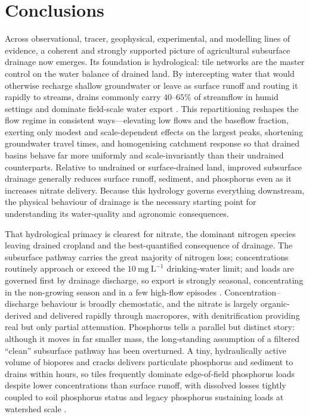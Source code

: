 \documentclass[11pt]{article}
\begin{document}
\section*{Conclusions}

Across observational, tracer, geophysical, experimental, and modelling lines
of evidence, a coherent and strongly supported picture of agricultural
subsurface drainage now emerges. Its foundation is hydrological: tile networks
are the master control on the water balance of drained land. By intercepting
water that would otherwise recharge shallow groundwater or leave as surface
runoff and routing it rapidly to streams, drains commonly carry $40$--$65\%$ of
streamflow in humid settings and dominate field-scale water export
\parencite{Schilling2019}. This
repartitioning reshapes the flow regime in consistent ways---elevating low
flows and the baseflow fraction, exerting only modest and scale-dependent
effects on the largest peaks, shortening groundwater travel times, and
homogenising catchment response so that drained basins behave far more
uniformly and scale-invariantly than their undrained counterparts. Relative to
undrained or surface-drained land, improved subsurface drainage generally
reduces surface runoff, sediment, and phosphorus even as it increases nitrate
delivery. Because this hydrology governs everything downstream, the physical
behaviour of drainage is the necessary starting point for understanding its
water-quality and agronomic consequences.

That hydrological primacy is clearest for nitrate, the dominant nitrogen
species leaving drained cropland and the best-quantified consequence of
drainage. The subsurface pathway carries the great majority of nitrogen loss;
concentrations routinely approach or exceed the $10~\mathrm{mg~L^{-1}}$
drinking-water limit; and loads are governed first by drainage discharge, so
export is strongly seasonal, concentrating in the non-growing season and in a
few high-flow episodes \parencite{Kladivko2021,Speir2021}. Concentration--discharge behaviour is broadly
chemostatic, and the nitrate is largely organic-derived and delivered rapidly
through macropores, with denitrification providing real but only partial
attenuation. Phosphorus tells a parallel but distinct story: although it moves
in far smaller mass, the long-standing assumption of a filtered ``clean''
subsurface pathway has been overturned. A tiny, hydraulically active volume of
biopores and cracks delivers particulate phosphorus and sediment to drains
within hours, so tiles frequently dominate edge-of-field phosphorus loads
despite lower concentrations than surface runoff, with dissolved losses tightly
coupled to soil phosphorus status and legacy phosphorus sustaining loads at
watershed scale \parencite{Pease2018,Sharpley1995}.
\end{document}
